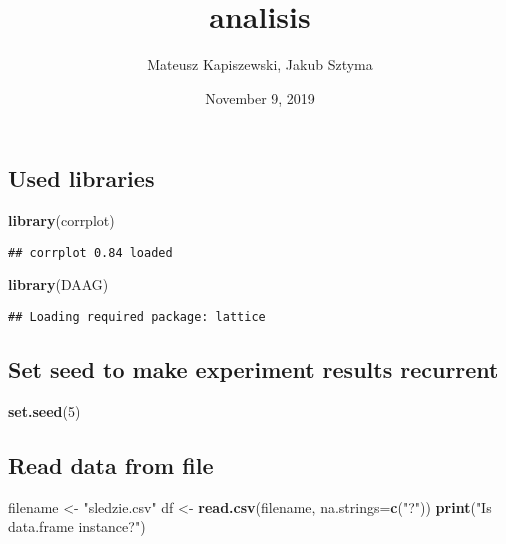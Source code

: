 \documentclass[]{article}
\title{analisis}
\author{Mateusz Kapiszewski, Jakub Sztyma}
\date{November 9, 2019}
\newenvironment{Shaded}{\begin{snugshade}}{\end{snugshade}}
\newcommand{\DataTypeTok}[1]{\textcolor[rgb]{0.13,0.29,0.53}{#1}}
\newcommand{\DecValTok}[1]{\textcolor[rgb]{0.00,0.00,0.81}{#1}}
\newcommand{\KeywordTok}[1]{\textcolor[rgb]{0.13,0.29,0.53}{\textbf{#1}}}
\newcommand{\NormalTok}[1]{#1}
\newcommand{\StringTok}[1]{\textcolor[rgb]{0.31,0.60,0.02}{#1}}
\begin{document}
\maketitle

\hypertarget{used-libraries}{%
\subsection{Used libraries}\label{used-libraries}}

\begin{Shaded}
\begin{Highlighting}[]
\KeywordTok{library}\NormalTok{(corrplot)}
\end{Highlighting}
\end{Shaded}

\begin{verbatim}
## corrplot 0.84 loaded
\end{verbatim}

\begin{Shaded}
\begin{Highlighting}[]
\KeywordTok{library}\NormalTok{(DAAG)}
\end{Highlighting}
\end{Shaded}

\begin{verbatim}
## Loading required package: lattice
\end{verbatim}

\hypertarget{set-seed-to-make-experiment-results-recurrent}{%
\subsection{Set seed to make experiment results
recurrent}\label{set-seed-to-make-experiment-results-recurrent}}

\begin{Shaded}
\begin{Highlighting}[]
\KeywordTok{set.seed}\NormalTok{(}\DecValTok{5}\NormalTok{)}
\end{Highlighting}
\end{Shaded}

\hypertarget{read-data-from-file}{%
\subsection{Read data from file}\label{read-data-from-file}}

\begin{Shaded}
\begin{Highlighting}[]
\NormalTok{filename <-}\StringTok{ "sledzie.csv"}
\NormalTok{df <-}\StringTok{ }\KeywordTok{read.csv}\NormalTok{(filename, }\DataTypeTok{na.strings=}\KeywordTok{c}\NormalTok{(}\StringTok{"?"}\NormalTok{))}
\KeywordTok{print}\NormalTok{(}\StringTok{"Is data.frame instance?"}\NormalTok{)}
\end{Highlighting}
\end{Shaded}
\end{document}
